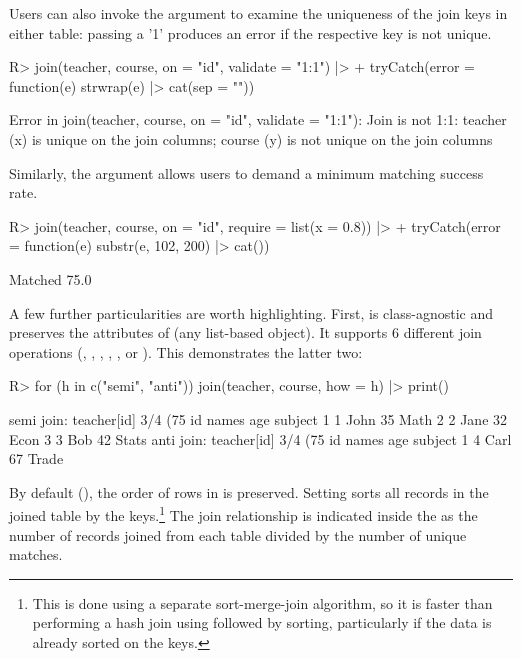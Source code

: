 \documentclass[nojss]{jss} %
\newcommand{\fct}[1]{\code{#1()}}
\begin{document}
Users can also invoke the  argument to examine the uniqueness of the join keys in either table: passing a '1' produces an error if the respective key is not unique.
%
\begin{Schunk}
\begin{Sinput}
R> join(teacher, course, on = "id", validate = "1:1") |>
+    tryCatch(error = function(e) strwrap(e) |> cat(sep = "\n"))
\end{Sinput}
\begin{Soutput}
Error in join(teacher, course, on = "id", validate = "1:1"): Join is
not 1:1: teacher (x) is unique on the join columns; course (y) is
not unique on the join columns
\end{Soutput}
\end{Schunk}
%
Similarly, the  argument allows users to demand a minimum matching success rate.
%
\begin{Schunk}
\begin{Sinput}
R> join(teacher, course, on = "id", require = list(x = 0.8)) |>
+    tryCatch(error = function(e) substr(e, 102, 200) |> cat())
\end{Sinput}
\begin{Soutput}
Matched 75.0% of records in table teacher (x), but 80.0% is required
\end{Soutput}
\end{Schunk}
%
A few further particularities are worth highlighting. First, \fct{join} is class-agnostic and preserves the attributes of  (any list-based object). It supports 6 different join operations (, , , , , or ). This demonstrates the latter two:
\begin{Schunk}
\begin{Sinput}
R> for (h in c("semi", "anti")) join(teacher, course, how = h) |> print()
\end{Sinput}
\begin{Soutput}
semi join: teacher[id] 3/4 (75%) <1:1st> course[id] 3/5 (60%)
  id names age subject
1  1  John  35    Math
2  2  Jane  32    Econ
3  3   Bob  42   Stats
anti join: teacher[id] 3/4 (75%) <1:1st> course[id] 3/5 (60%)
  id names age subject
1  4  Carl  67   Trade
\end{Soutput}
\end{Schunk}
By default (), the order of rows in  is preserved. Setting  sorts all records in the joined table by the keys.\footnote{This is done using a separate sort-merge-join algorithm, so it is faster than performing a hash join using \fct{fmatch} followed by sorting, particularly if the data is already sorted on the keys. } The join relationship is indicated inside the \code{<>} as the number of records joined from each table divided by the number of unique matches. %
\end{document}
